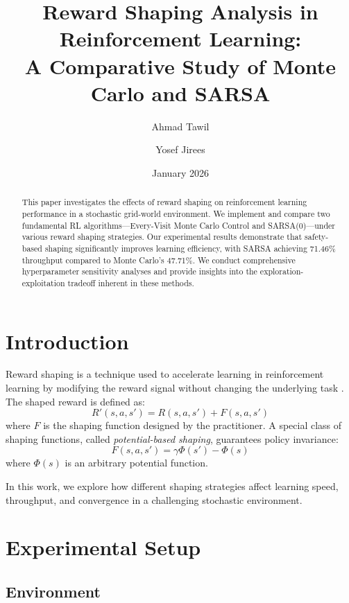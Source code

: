 \documentclass[11pt,a4paper]{article}
\title{\textbf{Reward Shaping Analysis in Reinforcement Learning:\\A Comparative Study of Monte Carlo and SARSA}}
\author{Ahmad Tawil \and Yosef Jirees}
\date{January 2026}
\begin{document}
\maketitle

\begin{abstract}
This paper investigates the effects of reward shaping on reinforcement learning performance in a stochastic grid-world environment. We implement and compare two fundamental RL algorithms---Every-Visit Monte Carlo Control and SARSA(0)---under various reward shaping strategies. Our experimental results demonstrate that safety-based shaping significantly improves learning efficiency, with SARSA achieving 71.46\% throughput compared to Monte Carlo's 47.71\%. We conduct comprehensive hyperparameter sensitivity analyses and provide insights into the exploration-exploitation tradeoff inherent in these methods.
\end{abstract}

\section{Introduction}

Reward shaping is a technique used to accelerate learning in reinforcement learning by modifying the reward signal without changing the underlying task \cite{ng1999policy}. The shaped reward is defined as:
\begin{equation}
R'(s,a,s') = R(s,a,s') + F(s,a,s')
\end{equation}
where $F$ is the shaping function designed by the practitioner. A special class of shaping functions, called \emph{potential-based shaping}, guarantees policy invariance:
\begin{equation}
F(s,a,s') = \gamma\Phi(s') - \Phi(s)
\end{equation}
where $\Phi(s)$ is an arbitrary potential function.

In this work, we explore how different shaping strategies affect learning speed, throughput, and convergence in a challenging stochastic environment.

\section{Experimental Setup}

\subsection{Environment}
\end{document}

